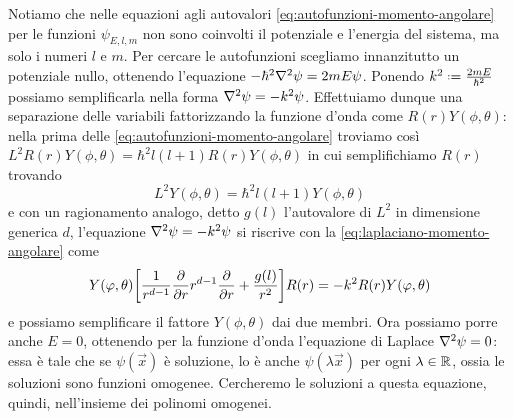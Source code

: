 Notiamo che nelle equazioni agli autovalori \eqref{eq:autofunzioni-momento-angolare} per le funzioni $\psi_{E,l,m}$ non sono coinvolti il potenziale e l'energia del sistema, ma solo i numeri $l$ e $m$.
Per cercare le autofunzioni scegliamo innanzitutto un potenziale nullo, ottenendo l'equazione $-\hbar^2\nabla^2\psi=2mE\psi$.
Ponendo $k^2\defeq\frac{2mE}{\hbar^2}$ possiamo semplificarla nella forma $\nabla^2\psi=-k^2\psi$.
Effettuiamo dunque una separazione delle variabili fattorizzando la funzione d'onda come $R(r)Y(\phi,\theta)$: nella prima delle \eqref{eq:autofunzioni-momento-angolare} troviamo cos\`i $L^2R(r)Y(\phi,\theta)=\hbar^2l(l+1)R(r)Y(\phi,\theta)$ in cui semplifichiamo $R(r)$ trovando
\begin{equation}
	L^2Y(\phi,\theta)=\hbar^2l(l+1)Y(\phi,\theta)
\end{equation}
e con un ragionamento analogo, detto $g(l)$ l'autovalore di $L^2$ in dimensione generica $d$, l'equazione $\nabla^2\psi=-k^2\psi$ si riscrive con la \eqref{eq:laplaciano-momento-angolare} come
\begin{equation}
	Y(\varphi,\theta)\bigg[\frac1{r^{d-1}}\frac{\partial {}}{\partial {r}}r^{d-1}\frac{\partial {}}{\partial {r}}+\frac{g(l)}{r^2}\bigg]R(r)=-k^2R(r)Y(\varphi,\theta)
	\label{eq:laplace-parte-radiale}
\end{equation}
e possiamo semplificare il fattore $Y(\phi,\theta)$ dai due membri.
Ora possiamo porre anche $E=0$, ottenendo per la funzione d'onda l'equazione di Laplace $\nabla^2\psi=0$: essa è tale che se $\psi(\vec x)$ è soluzione, lo è anche $\psi(\lambda\vec x)$ per ogni $\lambda\in\mathbb{R}$, ossia le soluzioni sono funzioni omogenee.
Cercheremo le soluzioni a questa equazione, quindi, nell'insieme dei polinomi omogenei.

